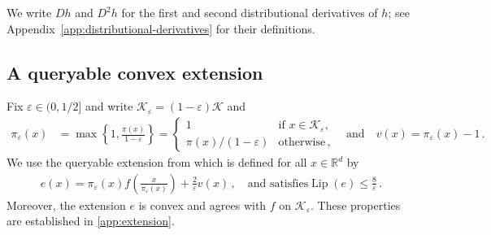 \documentclass{article}
\newcommand{\R}{\mathbb R}
\newcommand{\E}{\mathbb E}
\newcommand{\K}{\mathcal K}
\newcommand{\N}{\mathcal N}
\newcommand{\tr}{\operatorname{tr}}
\newcommand{\Lip}{\operatorname{Lip}}
\newcommand{\1}{\mathbf 1}
\newcommand{\eps}{\varepsilon}
\newcommand{\ip}[2]{\left\langle #1,#2\right\rangle}
\newcommand{\norm}[1]{\left\lVert #1\right\rVert}
\begin{document}
We write $Dh$ and $D^2h$ for the first and second distributional derivatives of $h$;
see Appendix~\ref{app:distributional-derivatives} for their definitions.

\subsection{A queryable convex extension}

Fix $\eps\in(0,1/2]$ and write $\K_\eps=(1-\eps)\K$ and
\begin{align}
    \pi_\eps(x)
     & =\max\left\{1,\frac{\pi(x)}{1-\eps}\right\}
    =\begin{cases}
         1               & \text{if }x\in\K_\eps, \\
         \pi(x)/(1-\eps) & \text{otherwise}\,,
     \end{cases}
    \quad\text{and}\quad v(x)=\pi_\eps(x)-1\,.
    \label{eq:extension-notation}
\end{align}
We use the queryable extension from
\citet[Eq.~(10.6)]{lattimore2026bandit} which is defined for all $x\in\R^d$ by
\begin{align}
    e(x)
    =\pi_\eps(x)f\!\left(\frac{x}{\pi_\eps(x)}\right)
    +\frac{2}{\eps}v(x)\,,
    \quad\text{and satisfies}
    \Lip(e)\leq\frac{8}{\eps}\,.
    \label{eq:extension-lipschitz}
\end{align}
Moreover, the extension $e$ is convex and agrees with $f$ on $\K_\eps$.
These properties are established in \cref{app:extension}.

\end{document}
